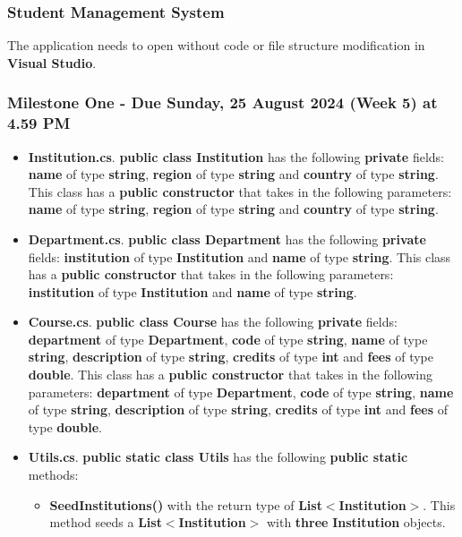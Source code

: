 \documentclass{article}
\begin{document}
\subsubsection*{Student Management System}

The application needs to open without code or file structure modification in \textbf{Visual Studio}.

\subsubsection*{Milestone One - Due Sunday, 25 August 2024 (Week 5) at 4.59 PM}

\begin{itemize}
    \item \textbf{Institution.cs}. \textbf{public class Institution} has the following \textbf{private} fields: \textbf{name} of type \textbf{string}, \textbf{region} of type \textbf{string} and \textbf{country} of type \textbf{string}. This class has a \textbf{public constructor} that takes in the following parameters: \textbf{name} of type \textbf{string}, \textbf{region} of type \textbf{string} and \textbf{country} of type \textbf{string}. 
    \item \textbf{Department.cs}. \textbf{public class Department} has the following \textbf{private} fields: \textbf{institution} of type \textbf{Institution} and \textbf{name} of type \textbf{string}. This class has a \textbf{public constructor} that takes in the following parameters: \textbf{institution} of type \textbf{Institution} and \textbf{name} of type \textbf{string}.
    \item \textbf{Course.cs}. \textbf{public class Course} has the following \textbf{private} fields: \textbf{department} of type \textbf{Department}, \textbf{code} of type \textbf{string}, \textbf{name} of type \textbf{string}, \textbf{description} of type \textbf{string}, \textbf{credits} of type \textbf{int} and \textbf{fees} of type \textbf{double}. This class has a \textbf{public constructor} that takes in the following parameters: \textbf{department} of type \textbf{Department}, \textbf{code} of type \textbf{string}, \textbf{name} of type \textbf{string}, \textbf{description} of type \textbf{string}, \textbf{credits} of type \textbf{int} and \textbf{fees} of type \textbf{double}.
    \item \textbf{Utils.cs}. \textbf{public static class Utils} has the following \textbf{public static} methods:
    \begin{itemize}
        \item \textbf{SeedInstitutions()} with the return type of \textbf{List$<$Institution$>$}. This method seeds a \textbf{List$<$Institution$>$} with \textbf{three} \textbf{Institution} objects.

\end{itemize}
\end{itemize}
\end{document}
